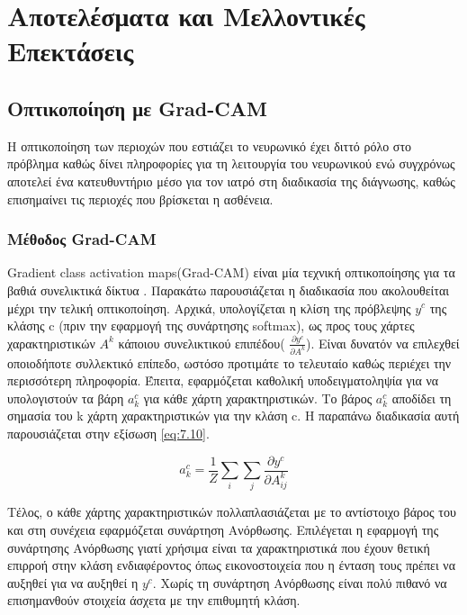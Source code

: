 \thispagestyle{plain}
\chapter{ Αποτελέσματα και Μελλοντικές Επεκτάσεις}
\label{chap:7}



\section{Οπτικοποίηση με Grad-CAM}
\label{chap:7.1}

Η οπτικοποίηση των περιοχών που εστιάζει το νευρωνικό έχει διττό ρόλο στο πρόβλημα καθώς δίνει πληροφορίες για τη λειτουργία του νευρωνικού ενώ συγχρόνως αποτελεί ένα κατευθυντήριο μέσο για τον ιατρό στη διαδικασία της διάγνωσης, καθώς επισημαίνει τις περιοχές που βρίσκεται η ασθένεια. 


\subsection{Μέθοδος Grad-CAM} 
\label{sec:7.1.1}
Gradient class activation maps(Grad-CAM) είναι μία τεχνική οπτικοποίησης για τα βαθιά συνελικτικά δίκτυα \cite{Ramprasaath}. Παρακάτω παρουσιάζεται η διαδικασία που ακολουθείται μέχρι την τελική οπτικοποίηση.
Αρχικά, υπολογίζεται  η κλίση της πρόβλεψης $y^c$ της κλάσης c (πριν την εφαρμογή της συνάρτησης softmax), ως προς τους χάρτες χαρακτηριστικών $ A^k $ κάποιου συνελικτικού επιπέδου( $\frac{\partial y^c}{\partial A^k }$). Είναι δυνατόν να επιλεχθεί οποιοδήποτε συλλεκτικό επίπεδο, ωστόσο προτιμάτε το τελευταίο καθώς περιέχει την περισσότερη πληροφορία.
 Έπειτα, εφαρμόζεται καθολική υποδειγματοληψία για να υπολογιστούν τα βάρη $a_{k}^c$ για κάθε χάρτη χαρακτηριστικών. Το βάρος $a_{k}^c$   αποδίδει τη σημασία του k χάρτη χαρακτηριστικών για την κλάση c. Η παραπάνω διαδικασία αυτή παρουσιάζεται στην εξίσωση \ref{eq:7.10}.

\begin{equation} \label{eq:7.10}
a_{k}^c =  \frac{1}{Z} \sum_{i}  \sum_{j} \frac{\partial y^c}{\partial A_{ij}^k }
\end{equation}

Τέλος, ο κάθε χάρτης χαρακτηριστικών πολλαπλασιάζεται με το αντίστοιχο βάρος του και στη συνέχεια εφαρμόζεται συνάρτηση Ανόρθωσης. Επιλέγεται η εφαρμογή της συνάρτησης Ανόρθωσης γιατί χρήσιμα είναι τα χαρακτηριστικά που έχουν θετική επιρροή στην κλάση ενδιαφέροντος όπως εικονοστοιχεία  που η ένταση τους πρέπει να αυξηθεί για να αυξηθεί η $y^{c}$. Χωρίς τη συνάρτηση Ανόρθωσης είναι πολύ πιθανό να επισημανθούν στοιχεία άσχετα με την επιθυμητή κλάση.

